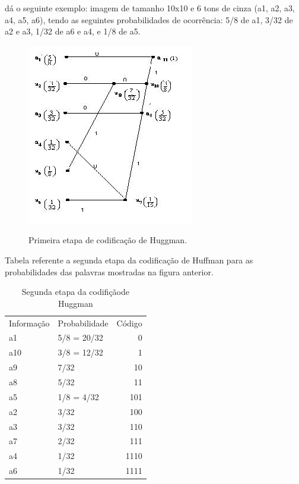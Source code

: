\citeauthor{losslesscodings} dá o seguinte exemplo: imagem de tamanho 10x10 e 6 tons de cinza (a1, a2, a3, a4, a5, a6), tendo as seguintes probabilidades de ocorrência: 5/8 de a1, 3/32 de a2 e a3, 1/32 de a6 e a4, e 1/8 de a5.

\begin{figure}[h]
\caption{\small Primeira etapa de codificação de Huggman.}
\centering
\includegraphics[scale=0.50]{figs/huffman_etapa1.jpg}
\label{f.huffmanetapa1}
\end{figure}

Tabela referente a segunda etapa da codificação de Huffman para as probabilidades das palavras mostradas na figura anterior.

\begin{table}[]
    \begin{center}
        \caption{\small Segunda etapa da codifiçãode Huggman}
        \label{t.huffmanetapa2}
        \begin{tabular}{llr}
            Informação & Probabilidade & Código \\
            a1         & 5/8 = 20/32   & 0      \\
            a10        & 3/8 = 12/32   & 1      \\
            a9         & 7/32          & 10     \\
            a8         & 5/32          & 11     \\
            a5         & 1/8 = 4/32    & 101    \\
            a2         & 3/32          & 100    \\
            a3         & 3/32          & 110    \\
            a7         & 2/32          & 111    \\
            a4         & 1/32          & 1110   \\
            a6         & 1/32          & 1111
        \end{tabular}
    \end{center}
\end{table}

